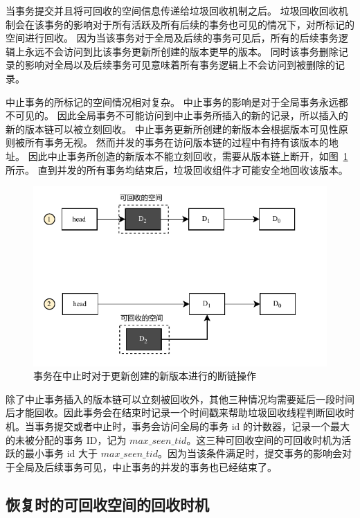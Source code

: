 当事务提交并且将可回收的空间信息传递给垃圾回收机制之后。
垃圾回收回收机制会在该事务的影响对于所有活跃及所有后续的事务也可见的情况下，对所标记的空间进行回收。
因为当该事务对于全局及后续的事务可见后，所有的后续事务逻辑上永远不会访问到比该事务更新所创建的版本更早的版本。
同时该事务删除记录的影响对全局以及后续事务可见意味着所有事务逻辑上不会访问到被删除的记录。

中止事务的所标记的空间情况相对复杂。
中止事务的影响是对于全局事务永远都不可见的。
因此全局事务不可能访问到中止事务所插入的新的记录，所以插入的新的版本链可以被立刻回收。
中止事务更新所创建的新版本会根据版本可见性原则被所有事务无视。
然而并发的事务在访问版本链的过程中有持有该版本的地址。
因此中止事务所创造的新版本不能立刻回收，需要从版本链上断开，如图~\ref{fig:insert-abort} 所示。
直到并发的所有事务均结束后，垃圾回收组件才可能安全地回收该版本。

\begin{figure}
    \centering
    \includegraphics[width=1\linewidth]{figures/gc-e.pdf}
    \caption{事务在中止时对于更新创建的新版本进行的断链操作}
    \label{fig:insert-abort}
\end{figure}

除了中止事务插入的版本链可以立刻被回收外，其他三种情况均需要延后一段时间后才能回收。因此事务会在结束时记录一个时间戳来帮助垃圾回收线程判断回收时机。当事务提交或者中止时，事务会访问全局的事务 id 的计数器，记录一个最大的未被分配的事务 ID，记为 $max\_seen\_tid$。这三种可回收空间的可回收时机为活跃的最小事务 id 大于 $max\_seen\_tid$。因为当该条件满足时，提交事务的影响会对于全局及后续事务可见，中止事务的并发的事务也已经结束了。

\subsection{恢复时的可回收空间的回收时机}

